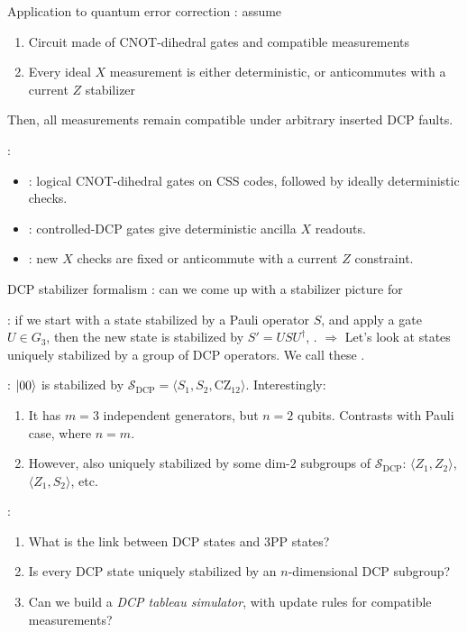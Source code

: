 \documentclass[aspectratio=169,11pt,t]{beamer}
\begin{document}
\begin{frame}{Application to quantum error correction}
  : assume
  \begin{enumerate}
    \item Circuit made of CNOT-dihedral gates and compatible measurements
    \item Every ideal $X$ measurement is either deterministic, or anticommutes with a current $Z$ stabilizer
  \end{enumerate}
  Then, all measurements remain compatible under arbitrary inserted DCP faults.

  \pause
  :
  \begin{itemize}
    \item {}: logical
      CNOT-dihedral gates on CSS codes, followed by ideally deterministic checks.
    \item {}: controlled-DCP gates give deterministic ancilla $X$ readouts.
    \item {}: new $X$ checks are
      fixed or anticommute with a current $Z$ constraint.
  \end{itemize}
\end{frame}


\begin{frame}{DCP stabilizer formalism}
  : can we come up with a stabilizer picture for

  \pause
  : if we start with a state stabilized by a Pauli operator $S$, and apply a gate $U \in G_3$, then the new state is stabilized by $S'=U S U^\dag$, .
  \newline
  $\Rightarrow$ Let's look at states uniquely stabilized by a group of DCP operators. We call these .

  \pause
  : $\ket{00}$ is stabilized by
  $\mathcal{S}_{\text{DCP}} = \langle S_1, S_2, \text{CZ}_{12} \rangle$. Interestingly:
  \begin{enumerate}
    \item It has $m=3$ independent generators, but $n=2$ qubits. Contrasts with Pauli case, where $n=m$.
    \item However, also uniquely stabilized by some dim-$2$ subgroups of $\mathcal{S}_{\text{DCP}}$: $\langle Z_1, Z_2 \rangle$, $\langle Z_1, S_2 \rangle$, etc.
  \end{enumerate}

  :
  \begin{enumerate}
    \item What is the link between DCP states and 3PP states?
    \item Is every DCP state uniquely stabilized by an $n$-dimensional DCP subgroup?
    \item Can we build a \textit{DCP tableau simulator}, with update rules for compatible measurements?
  \end{enumerate}
\end{frame}
\end{document}
